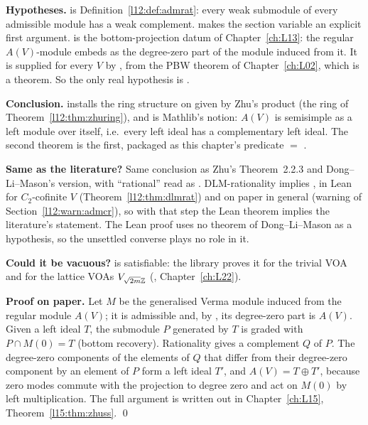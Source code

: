 \begin{dictionary}
\textbf{Hypotheses.}  is Definition~\ref{l12:def:admrat}: every weak submodule of every
admissible module has a weak complement.  makes the section variable  an explicit first
argument.  is the bottom-projection datum of Chapter~\ref{ch:L13}: the regular $A(V)$-module embeds as the degree-zero
part of the module induced from it. It is supplied for every $V$ by , from the PBW theorem
 of Chapter~\ref{ch:L02}, which is a theorem. So the only real hypothesis is .

\textbf{Conclusion.}  installs the ring structure on  given by Zhu's product (the ring of
Theorem~\ref{l12:thm:zhuring}), and  is Mathlib's notion: $A(V)$ is semisimple as a left module
over itself, i.e.\ every left ideal has a complementary left ideal. The second theorem is the first, packaged as this chapter's
predicate  $=$ .

\textbf{Same as the literature?} Same conclusion as Zhu's Theorem~2.2.3 and Dong--Li--Mason's version, with ``rational'' read
as . DLM-rationality implies , in Lean for $C_2$-cofinite $V$
(Theorem~\ref{l12:thm:dlmrat}) and on paper in general (warning of Section~\ref{l12:warn:admcr}), so with that step the
Lean theorem implies the literature's statement. The Lean proof uses no
theorem of Dong--Li--Mason as a hypothesis, so the unsettled converse plays no role in it.

\textbf{Could it be vacuous?}  is satisfiable: the library proves it for the trivial VOA and for the
lattice VOAs $V_{\sqrt{2m}{\mathbb{Z}}}$ (, Chapter~\ref{ch:L22}).
\end{dictionary}

\textbf{Proof on paper.} Let $M$ be the generalised Verma module induced from the regular module $A(V)$; it is admissible and,
by , its degree-zero part is $A(V)$. Given a left ideal $T$, the submodule $P$ generated by $T$ is graded with
$P\cap M(0)=T$ (bottom recovery). Rationality gives a complement $Q$ of $P$. The degree-zero components of the elements of $Q$
that differ from their degree-zero component by an element of $P$ form a left ideal $T'$, and $A(V)=T\oplus T'$, because zero
modes commute with the projection to degree zero and act on $M(0)$ by left multiplication. The full argument is written out in
Chapter~\ref{ch:L15}, Theorem~\ref{l15:thm:zhuss}. \qed

